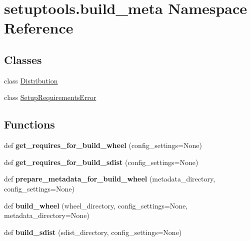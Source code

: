 \hypertarget{namespacesetuptools_1_1build__meta}{}\section{setuptools.\+build\+\_\+meta Namespace Reference}
\label{namespacesetuptools_1_1build__meta}
\subsection*{Classes}
\begin{DoxyCompactItemize}
\item 
class \hyperlink{classsetuptools_1_1build__meta_1_1_distribution}{Distribution}
\item 
class \hyperlink{classsetuptools_1_1build__meta_1_1_setup_requirements_error}{Setup\+Requirements\+Error}
\end{DoxyCompactItemize}
\subsection*{Functions}
\begin{DoxyCompactItemize}
\item 
\mbox{\label{namespacesetuptools_1_1build__meta_a7002f4b5b1ea78f5a0d4e09348ede8a9}} 
def {\bfseries get\+\_\+requires\+\_\+for\+\_\+build\+\_\+wheel} (config\+\_\+settings=None)
\item 
\mbox{\label{namespacesetuptools_1_1build__meta_a986884b24d7d9a04170970819c58d13c}} 
def {\bfseries get\+\_\+requires\+\_\+for\+\_\+build\+\_\+sdist} (config\+\_\+settings=None)
\item 
\mbox{\label{namespacesetuptools_1_1build__meta_a58fe16f71e4ad70f672029b7768a9e6f}} 
def {\bfseries prepare\+\_\+metadata\+\_\+for\+\_\+build\+\_\+wheel} (metadata\+\_\+directory, config\+\_\+settings=None)
\item 
\mbox{\label{namespacesetuptools_1_1build__meta_a041a2f5fa5e9f3e970dca930487839f5}} 
def {\bfseries build\+\_\+wheel} (wheel\+\_\+directory, config\+\_\+settings=None, metadata\+\_\+directory=None)
\item 
\mbox{\label{namespacesetuptools_1_1build__meta_a78b199c1814f7773e96c5c6edf3709a8}} 
def {\bfseries build\+\_\+sdist} (sdist\+\_\+directory, config\+\_\+settings=None)
\end{DoxyCompactItemize}


